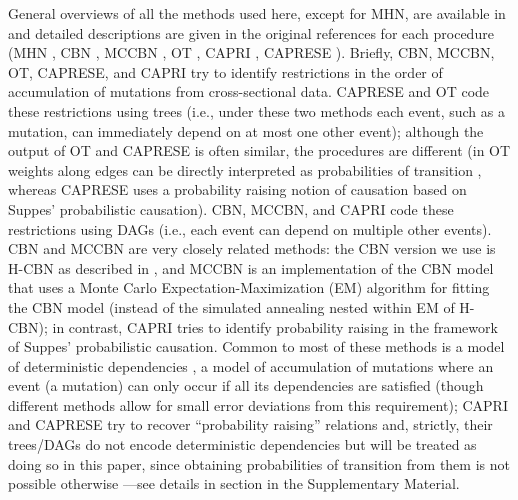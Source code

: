 \documentclass[a4paper,10pt]{article}
\begin{document}
General overviews of all the methods used here, except for MHN, are
available in \cite{beerenwinkel_computational_2016, Beerenwinkel2014,
  diaz-uriarte2019a,diaz-uriarte2018} and detailed descriptions are given
in the original references for each procedure (MHN \cite{schill2020}, CBN
\cite{Gerstung2009, Gerstung2011}, MCCBN
\cite{montazeri_large-scale_2016}, OT \cite{Szabo2008, Desper1999JCB},
CAPRI \cite{capri_bioinformatics, capri_pnas}, CAPRESE
\cite{caprese_2014}). Briefly, CBN, MCCBN, OT, CAPRESE, and CAPRI try to
identify restrictions in the order of accumulation of mutations from
cross-sectional data. CAPRESE and OT code these restrictions using trees
(i.e., under these two methods each event, such as a mutation, can
immediately depend on at most one other event); although the output of OT
and CAPRESE is often similar, the procedures are different (in OT weights
along edges can be directly interpreted as probabilities of transition
\cite{Szabo2008}, whereas CAPRESE uses a probability raising notion of
causation based on Suppes' probabilistic causation). CBN, MCCBN, and CAPRI
code these restrictions using DAGs (i.e., each event can depend on
multiple other events).  CBN and MCCBN are very closely related methods:
the CBN version we use is H-CBN as described in \cite{Gerstung2009,
  Gerstung2011}, and MCCBN is an implementation of the CBN model that uses
a Monte Carlo Expectation-Maximization (EM) algorithm for fitting the CBN
model \cite{montazeri_large-scale_2016} (instead of the simulated
annealing nested within EM of H-CBN); in contrast, CAPRI tries to identify
probability raising in the framework of Suppes' probabilistic
causation. Common to most of these methods is a model of deterministic
dependencies \cite{schill2020}, a model of accumulation of mutations where
an event (a mutation) can only occur if all its dependencies are satisfied
(though different methods allow for small error deviations from this
requirement); CAPRI and CAPRESE try to recover ``probability raising''
relations and, strictly, their trees/DAGs do not encode deterministic
dependencies but will be treated as doing so in this paper, since
obtaining probabilities of transition from them is not possible otherwise
---see details in section  in the Supplementary
Material.
\end{document}
